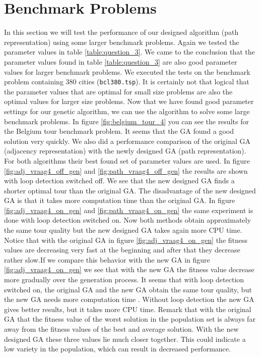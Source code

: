 

\section{Benchmark Problems}
\label{sec:benchmarks}

In this section we will test the performance of our designed algorithm (path representation) using some larger benchmark problems. Again we tested the parameter values in table \ref{table:question_3}. We came to the conclusion that the parameter values found in table \ref{table:question_3} are also good parameter values for larger benchmark problems. We executed the tests on the benchmark problem containing 380 cities (\texttt{bcl380.tsp}). It is certainly not that logical that the parameter values that are optimal for small size problems are also the optimal values for larger size problems. Now that we have found good parameter settings for our genetic algorithm, we can use the algorithm to solve some large benchmark problems.
In figure \ref{fig:belgium_tour_4} you can see the results for the Belgium tour benchmark problem. It seems that the GA found a good solution very quickly. 
\newline
\newline
We also did a performance comparison of the original GA (adjacency representation) with the newly designed GA (path representation). For both algorithms their best found set of parameter values are used. In figure \ref{fig:adj_vraag4_off_gen} and \ref{fig:path_vraag4_off_gen} the results are shown with loop detection switched off. We see that the new designed GA finds a shorter optimal tour than the original GA. The disadvantage of the new designed GA is that it takes more computation time than the original GA. In figure \ref{fig:adj_vraag4_on_gen} and \ref{fig:path_vraag4_on_gen} the same experiment is done with loop detection switched on. Now both methods obtain approximately the same tour quality but the new designed GA takes again more CPU time. Notice that with the original GA in figure \ref{fig:adj_vraag4_on_gen} the fitness values are decreasing very fast at the beginning and after that they decrease rather slow.If we compare this behavior with the new GA in figure \ref{fig:adj_vraag4_on_gen} we see that with the new GA the fitness value decrease more gradually over the generation process. 
\newline
\newline
It seems that with loop detection switched on, the original GA and the new GA obtain the same tour quality, but the new GA needs more computation time . Without loop detection the new GA gives better results, but it takes more CPU time. Remark that with the original GA that the fitness value of the worst solution in the population set is always far away from the fitness values of the best and average solution. With the new designed GA these three values lie much closer together. This could indicate a low variety in the population, which can result in decreased performance.

